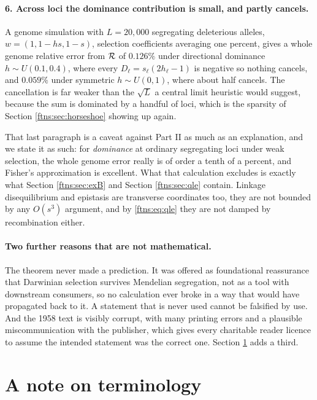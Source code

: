 \paragraph{6. Across loci the dominance contribution is small, and partly cancels.}
A genome simulation with $L=20{,}000$ segregating deleterious alleles, $w=(1,1-hs,1-s)$, selection
coefficients averaging one percent, gives a whole genome relative error from $\mathcal{R}$ of $0.126\%$
under directional dominance $h\sim U(0.1,0.4)$, where every $D_\ell=s_\ell(2h_\ell-1)$ is negative
so nothing cancels, and $0.059\%$ under symmetric $h\sim U(0,1)$, where about half cancels. The
cancellation is far weaker than the $\sqrt L$ a central limit heuristic would suggest, because the
sum is dominated by a handful of loci, which is the sparsity of Section \ref{ftns:sec:horseshoe} showing
up again.

That last paragraph is a caveat against Part II as much as an explanation, and we state it as such:
for \emph{dominance} at ordinary segregating loci under weak selection, the whole genome error
really is of order a tenth of a percent, and Fisher's approximation is excellent. What that
calculation excludes is exactly what Section \ref{ftns:sec:exB} and Section \ref{ftns:sec:qle} contain.
Linkage disequilibrium and epistasis are transverse coordinates too, they are not bounded by any
$O(s^3)$ argument, and by \eqref{ftns:eq:qle} they are not damped by recombination either.

\paragraph{Two further reasons that are not mathematical.}
The theorem never made a prediction. It was offered as foundational reassurance that Darwinian
selection survives Mendelian segregation, not as a tool with downstream consumers, so no
calculation ever broke in a way that would have propagated back to it. A statement that is never
used cannot be falsified by use. And the 1958 text is visibly corrupt, with many printing errors
and a plausible miscommunication with the publisher, which gives every charitable reader licence to
assume the intended statement was the correct one. Section \ref{ftns:sec:terminology} adds a third.

\section{A note on terminology}
\label{ftns:sec:terminology}


